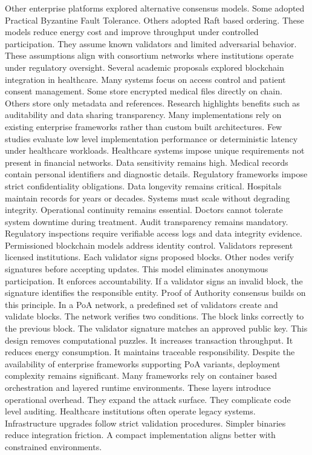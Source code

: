 Other enterprise platforms explored alternative consensus models. Some adopted Practical Byzantine Fault Tolerance. Others adopted Raft based ordering. These models reduce energy cost and improve throughput under controlled participation. They assume known validators and limited adversarial behavior. These assumptions align with consortium networks where institutions operate under regulatory oversight.
Several academic proposals explored blockchain integration in healthcare. Many systems focus on access control and patient consent management. Some store encrypted medical files directly on chain. Others store only metadata and references. Research highlights benefits such as auditability and data sharing transparency. Many implementations rely on existing enterprise frameworks rather than custom built architectures. Few studies evaluate low level implementation performance or deterministic latency under healthcare workloads.
Healthcare systems impose unique requirements not present in financial networks.
Data sensitivity remains high. Medical records contain personal identifiers and diagnostic details. Regulatory frameworks impose strict confidentiality obligations.
Data longevity remains critical. Hospitals maintain records for years or decades. Systems must scale without degrading integrity.
Operational continuity remains essential. Doctors cannot tolerate system downtime during treatment.
Audit transparency remains mandatory. Regulatory inspections require verifiable access logs and data integrity evidence.
Permissioned blockchain models address identity control. Validators represent licensed institutions. Each validator signs proposed blocks. Other nodes verify signatures before accepting updates. This model eliminates anonymous participation. It enforces accountability. If a validator signs an invalid block, the signature identifies the responsible entity.
Proof of Authority consensus builds on this principle. In a PoA network, a predefined set of validators create and validate blocks. The network verifies two conditions. The block links correctly to the previous block. The validator signature matches an approved public key. This design removes computational puzzles. It increases transaction throughput. It reduces energy consumption. It maintains traceable responsibility.
Despite the availability of enterprise frameworks supporting PoA variants, deployment complexity remains significant. Many frameworks rely on container based orchestration and layered runtime environments. These layers introduce operational overhead. They expand the attack surface. They complicate code level auditing.
Healthcare institutions often operate legacy systems. Infrastructure upgrades follow strict validation procedures. Simpler binaries reduce integration friction. A compact implementation aligns better with constrained environments.

